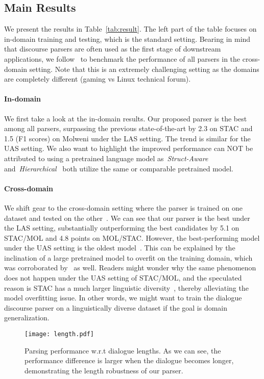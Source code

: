 \documentclass[11pt]{article}
\begin{document}
\subsection{Main Results}
We present the results in Table~\ref{tab:result}. The left part of the table focuses on in-domain training and testing, which is the standard setting. Bearing in mind that discourse parsers are often used as the first stage of downstream applications, we follow~\cite{liu-chen-2021-improving} to benchmark the performance of all parsers in the cross-domain setting. Note that this is an extremely challenging setting as the domains are completely different (gaming vs Linux technical forum).
\paragraph{In-domain}
We first take a look at the in-domain results. Our proposed parser is the best among all parsers, surpassing the previous state-of-the-art by 2.3 on STAC and 1.5 (F1 scores) on Molweni under the LAS setting. The trend is similar for the UAS setting. We also want to highlight the improved performance can NOT be attributed to using a pretrained language model as~\emph{Struct-Aware} and~\emph{Hierarchical}~\cite{liu-chen-2021-improving} both utilize the same or comparable pretrained model.
\paragraph{Cross-domain}
We shift gear to the cross-domain setting where the parser is trained on one dataset and tested on the other~\cite{liu-chen-2021-improving}. We can see that our parser is the best under the LAS setting, substantially outperforming the best candidates by 5.1 on STAC/MOL and 4.8 points on MOL/STAC.
However, the best-performing model under the UAS setting is the oldest model~\cite{afantenos2015discourse,perret2016integer}. This can be explained by the inclination of a large pretrained model to overfit on the training domain, which was corroborated by~\citet{liu-chen-2021-improving} as well. Readers might wonder why the same phenomenon does not happen under the UAS setting of STAC/MOL, and the speculated reason is STAC has a much larger linguistic diversity~\cite{liu-chen-2021-improving}, thereby alleviating the model overfitting issue. In other words, we might want to train the dialogue discourse parser on a linguistically diverse dataset if the goal is domain generalization.

\begin{figure}[]
\texttt{[image: length.pdf]}
\caption{Parsing performance w.r.t dialogue lengths. As we can see, the performance difference is larger when the dialogue becomes longer, demonstrating the length robustness of our parser.}
\label{fig:length}
\end{figure}
\end{document}
